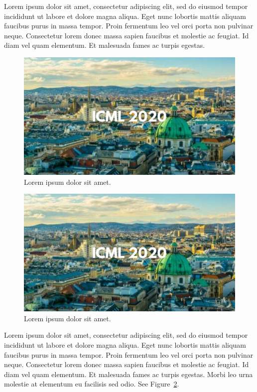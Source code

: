 \documentclass{article}
\begin{document}
Lorem ipsum dolor sit amet, consectetur adipiscing elit, sed do eiusmod tempor incididunt ut labore et dolore magna aliqua. Eget nunc lobortis mattis aliquam faucibus purus in massa tempor. Proin fermentum leo vel orci porta non pulvinar neque. Consectetur lorem donec massa sapien faucibus et molestie ac feugiat. Id diam vel quam elementum. Et malesuada fames ac turpis egestas.


\begin{figure}[H]
\vskip 0.2in
\begin{center}
\centerline{\includegraphics[width=0.8\columnwidth]{images/image-example.jpg}}
\caption{Lorem ipsum dolor sit amet.}
\label{overview}
\end{center}
\vskip -0.2in
\end{figure}




\begin{figure}[H]
\vskip 0.2in
\begin{center}
\centerline{\includegraphics[width=0.9\columnwidth]{images/image-example.jpg}}
\caption{Lorem ipsum dolor sit amet.}
\label{sample}
\end{center}
\vskip -0.2in
\end{figure}


Lorem ipsum dolor sit amet, consectetur adipiscing elit, sed do eiusmod tempor incididunt ut labore et dolore magna aliqua. Eget nunc lobortis mattis aliquam faucibus purus in massa tempor. Proin fermentum leo vel orci porta non pulvinar neque. Consectetur lorem donec massa sapien faucibus et molestie ac feugiat. Id diam vel quam elementum. Et malesuada fames ac turpis egestas. Morbi leo urna molestie at elementum eu facilisis sed odio. See Figure~\ref{sample}.
\end{document}
